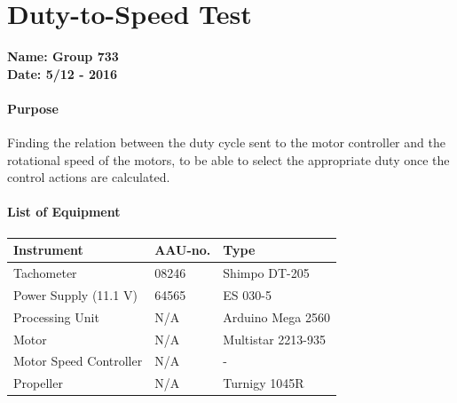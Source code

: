 \chapter{Duty-to-Speed Test}\label{app:duty} 
\textbf{Name: Group 733}\\
\textbf{Date: 5/12 - 2016}

\subsubsection{Purpose}
Finding the relation between the duty cycle sent to the motor controller and the rotational speed of the motors, to be able to select the appropriate duty once the control actions are calculated.

\subsubsection{List of Equipment}
\begin{table}[H]
	\begin{tabular}{|l|l|p{4.3cm}|}
		\hline%
		\textbf{Instrument}                          &  \textbf{AAU-no.}  &  \textbf{Type}                       \\
		\hline%
		Tachometer                                   &  08246             &  Shimpo DT-205		                   \\
		\hline%
	    Power Supply (11.1 V)                        &  64565             &  ES 030-5                 \\
		\hline%
		Processing Unit                              &  N/A               & Arduino Mega 2560    \\
		\hline%
		Motor                                        &  N/A               & Multistar 2213-935     \\
		\hline%
		Motor Speed Controller                       &  N/A               &  -      \\
		\hline%
		Propeller                                    &  N/A               & Turnigy 1045R     \\
		\hline%
	\end{tabular}
\end{table}

